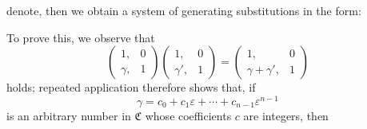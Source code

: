 denote, then we obtain a system of generating substitutions in the form:

To prove this, we observe that
\[ \begin{pmatrix} 1, & 0 \\ \gamma, & 1 \end{pmatrix} \begin{pmatrix} 1, & 0 \\ \gamma', & 1 \end{pmatrix} = \begin{pmatrix} 1, & 0 \\ \gamma + \gamma', & 1 \end{pmatrix} \]
holds; repeated application therefore shows that, if
\[ \gamma = c_0 + c_1 \varepsilon + \cdots + c_{n-1} \varepsilon^{n-1} \]
is an arbitrary number in $\mathfrak{C}$ whose coefficients $c$ are integers, then

